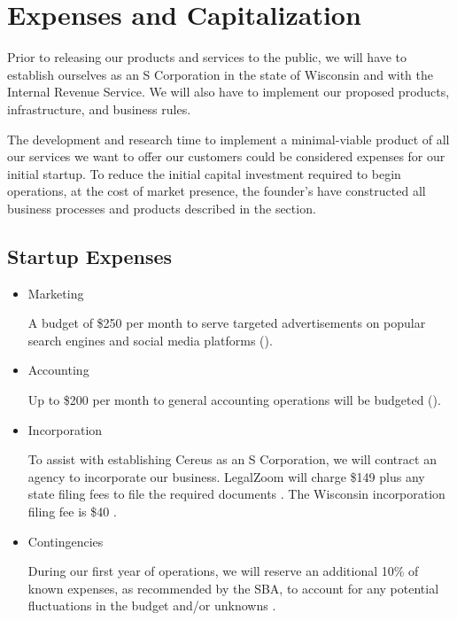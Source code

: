 {\let\cleardoublepage\relax \chapter{Expenses and Capitalization}}

Prior to releasing our products and services to the public, we will have to establish ourselves as an S Corporation in the state of Wisconsin and with the Internal Revenue Service. We will also have to implement our proposed products, infrastructure, and business rules.

The development and research time to implement a minimal-viable product of all our services we want to offer our customers could be considered expenses for our initial startup. To reduce the initial capital investment required to begin operations, at the cost of market presence, the founder's have constructed all business processes and products described in the  section.

\section{Startup Expenses} \label {startup.exp}

\begin{itemize}

\item Marketing

A budget of \$250 per month to serve targeted advertisements on popular search engines and social media platforms ().

\item Accounting

Up to \$200 per month to general accounting operations will be budgeted (). 

\item Incorporation

To assist with establishing Cereus as an S Corporation, we will contract an agency to incorporate our business. LegalZoom will charge \$149 plus any state filing fees to file the required documents \cite{legalzoom.2020}. The Wisconsin incorporation filing fee is \$40 \cite{wi.2018}.

\item Contingencies

During our first year of operations, we will reserve an additional 10\% of known expenses, as recommended by the SBA, to account for any potential fluctuations in the budget and/or unknowns \cite{sba.2020}.

\end{itemize}

